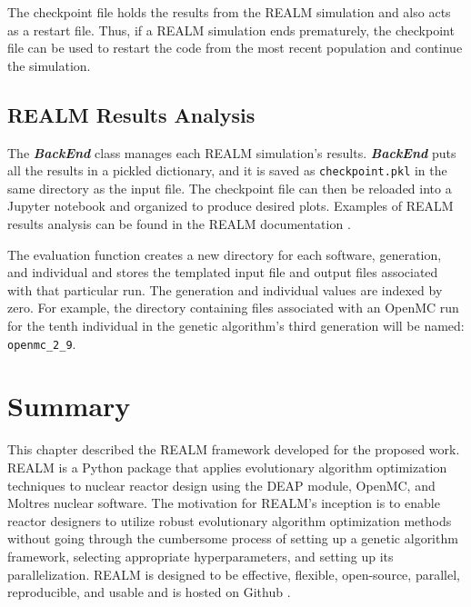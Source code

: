 The checkpoint file holds the results from the REALM simulation and also acts 
as a restart file. 
Thus, if a REALM simulation ends prematurely, the checkpoint file can be used 
to restart the code from the most recent population and continue the simulation. 

\subsection{REALM Results Analysis}
The \textbf{\textit{BackEnd}} class manages each REALM simulation's results. 
\textbf{\textit{BackEnd}} puts all the results in a pickled dictionary, and it 
is saved as \texttt{checkpoint.pkl} in the same directory as the input file. 
The checkpoint file can then be reloaded into a Jupyter notebook and organized 
to produce desired plots. 
Examples of REALM results analysis can be found in the REALM documentation 
\cite{chee_arfcrealm_2021}. 

The evaluation function creates a new directory for each software, generation, 
and individual and stores the templated input file and output files associated 
with that particular run. 
The generation and individual values are indexed by zero. 
For example, the directory containing files associated with an OpenMC run for 
the tenth individual in the genetic algorithm's third generation will be named: 
\texttt{openmc\_2\_9}.




\section{Summary}
This chapter described the \acrfull{REALM} framework developed for the
proposed work. 
\gls{REALM} is a Python package that applies evolutionary algorithm 
optimization techniques to nuclear reactor design using the \acrfull{DEAP} 
module, OpenMC, and Moltres nuclear software. 
The motivation for REALM's inception is to enable reactor designers to utilize 
robust evolutionary algorithm optimization methods without going 
through the cumbersome process of setting up a genetic algorithm framework,
selecting appropriate hyperparameters, and setting up its parallelization. 
REALM is designed to be effective, flexible, open-source, parallel, 
reproducible, and usable and is hosted on Github \cite{chee_arfcrealm_2021}. 